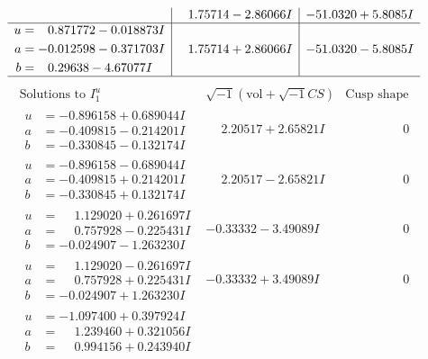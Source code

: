 \documentclass[1p]{elsarticle_modified}
\theoremstyle{definition}
\newcommand{\I}{\sqrt{-1}}
\begin{document}
$$\begin{array}{c|c|c}
 & \phantom{-}1.75714 - 2.86066 I & -51.0320 + 5.8085 I \\ \hline\begin{aligned}
u &= \phantom{-}0.871772 - 0.018873 I \\
a &= -0.012598 - 0.371703 I \\
b &= \phantom{-}0.29638 - 4.67077 I\end{aligned}
 & \phantom{-}1.75714 + 2.86066 I & -51.0320 - 5.8085 I\\
 \hline 
 \end{array}$$\newpage$$\begin{array}{c|c|c}  
\text{Solutions to }I^u_{1}& \I (\text{vol} + \sqrt{-1}CS) & \text{Cusp shape}\\
 \hline 
\begin{aligned}
u &= -0.896158 + 0.689044 I \\
a &= -0.409815 - 0.214201 I \\
b &= -0.330845 - 0.132174 I\end{aligned}
 & \phantom{-}2.20517 + 2.65821 I & \phantom{-0.000000 } 0 \\ \hline\begin{aligned}
u &= -0.896158 - 0.689044 I \\
a &= -0.409815 + 0.214201 I \\
b &= -0.330845 + 0.132174 I\end{aligned}
 & \phantom{-}2.20517 - 2.65821 I & \phantom{-0.000000 } 0 \\ \hline\begin{aligned}
u &= \phantom{-}1.129020 + 0.261697 I \\
a &= \phantom{-}0.757928 - 0.225431 I \\
b &= -0.024907 - 1.263230 I\end{aligned}
 & -0.33332 - 3.49089 I & \phantom{-0.000000 } 0 \\ \hline\begin{aligned}
u &= \phantom{-}1.129020 - 0.261697 I \\
a &= \phantom{-}0.757928 + 0.225431 I \\
b &= -0.024907 + 1.263230 I\end{aligned}
 & -0.33332 + 3.49089 I & \phantom{-0.000000 } 0 \\ \hline\begin{aligned}
u &= -1.097400 + 0.397924 I \\
a &= \phantom{-}1.239460 + 0.321056 I \\
b &= \phantom{-}0.994156 + 0.243940 I\end{aligned}

\end{array}$$
\end{document}
